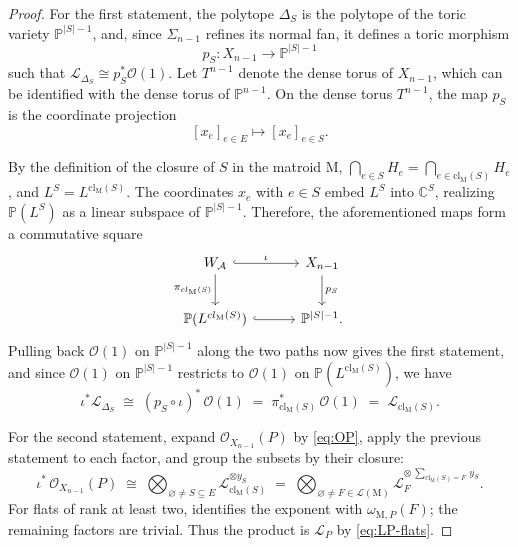 \documentclass[10pt,a4paper]{amsart}
\def\C{\mathbb{C}}
\newcommand{\M}{\mathrm{M}}
\def\P{\mathbb{P}}
\newcommand{\abs}[1]{\left\lvert#1\right\rvert}
\newcommand{\cL}{\mathcal{L}}
\newcommand{\cO}{\mathcal{O}}
\def\calA{\mathcal{A}}
\def\calL{\mathcal{L}}
\newcommand{\cl}{\textrm{cl}}
\renewcommand{\emptyset}{\varnothing}
\begin{document}
\begin{proof}
  For the first statement, the polytope $\Delta_S$ is the polytope of the toric variety $\P^{|S|-1}$,
  and, since $\Sigma_{n-1}$ refines its normal fan, it defines a toric morphism
  \[
    p_{S} \colon X_{n-1} \longrightarrow \P^{|S|-1}
  \]
  such that $\cL_{\Delta_S} \cong p_S^{\ast}\cO(1)$.  Let $T^{n-1}$ denote the dense torus
  of $X_{n-1}$, which can be identified with the dense torus of $\P^{n-1}$.  On the dense torus $T^{n-1}$, the map $p_S$ is the coordinate projection
  \[
    [x_e]_{e \in E} \longmapsto [x_e]_{e \in S} .
  \]

  By the definition of the closure of $S$ in the matroid $\M$,
  $\bigcap_{e \in S} H_e = \bigcap_{e \in \cl_{\M}(S)} H_e$, and
  $L^{S} = L^{\cl_{\M}(S)}$.  The coordinates $x_e$ with $e \in S$ embed $L^{S}$
  into $\C^{S}$, realizing $\P(L^{S})$ as a linear subspace of $\P^{|S|-1}$.
  Therefore, the aforementioned maps form a commutative square
  \[
    \begin{tikzcd}[row sep=2.2em, column sep=3em]
      W_{\calA} \arrow[r, hook, "\iota"] \arrow[d, "\pi_{\cl_{\M}(S)}"'] & X_{n-1} \arrow[d, "p_S"] \\
      \P(L^{\cl_{\M}(S)}) \arrow[r, hook] & \P^{|S|-1}.
    \end{tikzcd}
  \]
  Pulling back $\cO(1)$ on $\P^{\abs{S}-1}$ along the two paths
  now gives the first statement, and since $\cO(1)$ on $\P^{\abs{S}-1}$ restricts to $\cO(1)$ on $\P(L^{\cl_{\M}(S)})$, we have
  \[
    \iota^{*}\cL_{\Delta_S} \;\cong\; (p_S \circ \iota)^{*}\,\cO(1)
    \;=\; \pi_{\cl_{\M}(S)}^{*}\,\cO(1) \;=\; \cL_{\cl_{\M}(S)} .
  \]

  For the second statement, expand $\cO_{X_{n-1}}(P)$ by \eqref{eq:OP}, apply the
  previous statement to each factor, and group the subsets by their closure:
  \[
    \iota^{*}\, \cO_{X_{n-1}}(P)
    \;\cong\;
    \bigotimes_{\emptyset \ne S \subseteq E} \cL_{\cl_{\M}(S)}^{\otimes y_S}
    \;=\;
    \bigotimes_{\emptyset \ne F \in \calL(\M)}
      \cL_{F}^{\otimes\, \sum_{\cl_{\M}(S) = F}\, y_S} .
  \]
  For flats of rank at least two,  identifies the
  exponent with $\omega_{\M,P}(F)$; the remaining factors are trivial. Thus
  the product is $\cL_P$ by \eqref{eq:LP-flats}.
\end{proof}
\end{document}
